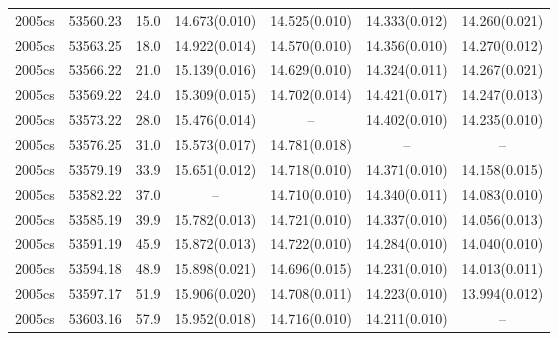 \begin{table*}
\begin{tabular}{ccccccc}
2005cs	  & 53560.23	 & 15.0	& 14.673(0.010)	 & 14.525(0.010)	 & 14.333(0.012)	 & 14.260(0.021) \\ 
2005cs	  & 53563.25	 & 18.0	& 14.922(0.014)	 & 14.570(0.010)	 & 14.356(0.010)	 & 14.270(0.012) \\ 
2005cs	  & 53566.22	 & 21.0	& 15.139(0.016)	 & 14.629(0.010)	 & 14.324(0.011)	 & 14.267(0.021) \\ 
2005cs	  & 53569.22	 & 24.0	& 15.309(0.015)	 & 14.702(0.014)	 & 14.421(0.017)	 & 14.247(0.013) \\ 
2005cs	  & 53573.22	 & 28.0	& 15.476(0.014)	 & --	 & 14.402(0.010)	 & 14.235(0.010) \\ 
2005cs	  & 53576.25	 & 31.0	& 15.573(0.017)	 & 14.781(0.018)	 & --	 & -- \\ 
2005cs	  & 53579.19	 & 33.9	& 15.651(0.012)	 & 14.718(0.010)	 & 14.371(0.010)	 & 14.158(0.015) \\ 
2005cs	  & 53582.22	 & 37.0	& --	 & 14.710(0.010)	 & 14.340(0.011)	 & 14.083(0.010) \\ 
2005cs	  & 53585.19	 & 39.9	& 15.782(0.013)	 & 14.721(0.010)	 & 14.337(0.010)	 & 14.056(0.013) \\ 
2005cs	  & 53591.19	 & 45.9	& 15.872(0.013)	 & 14.722(0.010)	 & 14.284(0.010)	 & 14.040(0.010) \\ 
2005cs	  & 53594.18	 & 48.9	& 15.898(0.021)	 & 14.696(0.015)	 & 14.231(0.010)	 & 14.013(0.011) \\ 
2005cs	  & 53597.17	 & 51.9	& 15.906(0.020)	 & 14.708(0.011)	 & 14.223(0.010)	 & 13.994(0.012) \\ 
2005cs	  & 53603.16	 & 57.9	& 15.952(0.018)	 & 14.716(0.010)	 & 14.211(0.010)	 & -- \\ 
\hline
\end{tabular}
\end{table*}
